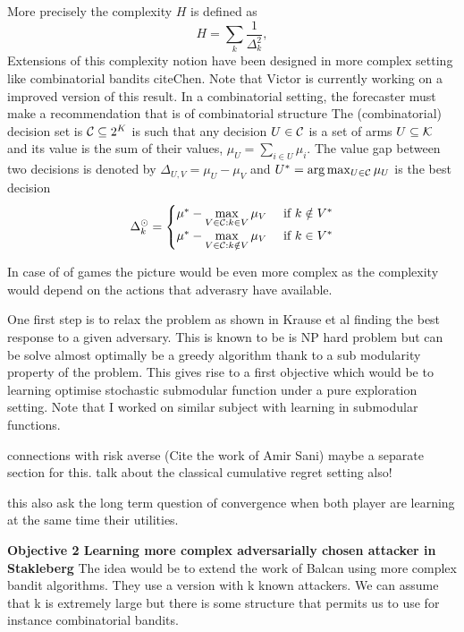  More precisely the complexity $H$ is  defined as
%
\begin{equation}
H = \sum_{k} \frac{1}{\Delta_k^2},
\end{equation}
%
Extensions of this complexity notion have been designed in more complex setting like combinatorial bandits cite{Chen}. Note that Victor is currently working on a improved version of this result. In a combinatorial setting, the forecaster must make a recommendation that is of combinatorial structure
 The (combinatorial) decision set is ${\mathcal{C}}\subseteq 2^K$ is such that any decision $U \in {\mathcal{C}}$ is a set of arms $U\subseteq {\mathcal{K}}$ and its value is the sum of their values, $\mu_U = \sum_{i \in U} \mu_i$. The value gap between two decisions is denoted by $\Delta_{U,V} = \mu_U - \mu_V$ and $U^* = \arg\max_{U\in{\mathcal{C}}} \mu_U$ is the best decision 
 \begin{align*}
\Delta^\odot_k = 
\begin{cases} 
\mu^* - \max\limits_{V\in{\mathcal{C}}: k\in V} \mu_V & \text{ if } k\notin V^* \\
\mu^* - \max\limits_{V\in{\mathcal{C}}: k\notin V} \mu_V & \text{ if } k\in V^* \\
\end{cases}
\end{align*}

In case of of games the picture would be even more complex as the complexity would depend on the actions that adverasry have available.

One first step is to relax the problem as shown in Krause et al finding the best response to a given adversary. This is known to be is NP hard problem  but can be solve almost optimally be a greedy algorithm thank to a sub modularity property of the problem. This gives rise to a first objective which would be to learning optimise stochastic submodular function under a pure exploration setting.
Note that I worked on similar subject with learning in submodular functions.

connections with risk averse (Cite the work of Amir Sani) maybe a separate section for this.
talk about the classical cumulative regret setting also!

this also ask the long term question of convergence when both player are learning at the same time their utilities.

\textbf{Objective 2 Learning  more complex adversarially chosen attacker in  Stakleberg}
The idea would be to  extend the work of Balcan using more complex bandit algorithms. They use a version with k known attackers. We can assume that k is extremely large but there is some  structure that permits us to use for instance combinatorial bandits.



